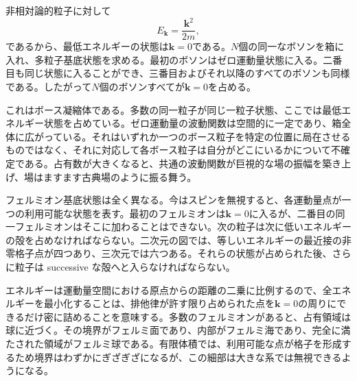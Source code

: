 非相対論的粒子に対して
\begin{equation}
E_{\mathbf{k}}=\frac{\mathbf{k}^2}{2m},
\end{equation}
であるから、最低エネルギーの状態は\(\mathbf{k}=0\)である。\(N\)個の同一なボソンを箱に入れ、多粒子基底状態を求める。最初のボソンはゼロ運動量状態に入る。二番目も同じ状態に入ることができ、三番目およびそれ以降のすべてのボソンも同様である。したがって\(N\)個のボソンすべてが\(\mathbf{k}=0\)を占める。

これはボース凝縮体である。多数の同一粒子が同じ一粒子状態、ここでは最低エネルギー状態を占めている。ゼロ運動量の波動関数は空間的に一定であり、箱全体に広がっている。それはいずれか一つのボース粒子を特定の位置に局在させるものではなく、それに対応して各ボース粒子は自分がどこにいるかについて不確定である。占有数が大きくなると、共通の波動関数が巨視的な場の振幅を築き上げ、場はますます古典場のように振る舞う。

フェルミオン基底状態は全く異なる。今はスピンを無視すると、各運動量点が一つの利用可能な状態を表す。最初のフェルミオンは\(\mathbf{k}=0\)に入るが、二番目の同一フェルミオンはそこに加わることはできない。次の粒子は次に低いエネルギーの殻を占めなければならない。二次元の図では、等しいエネルギーの最近接の非零格子点が四つあり、三次元では六つある。それらの状態が占められた後、さらに粒子は successive な殻へと入らなければならない。

エネルギーは運動量空間における原点からの距離の二乗に比例するので、全エネルギーを最小化することは、排他律が許す限り占められた点を\(\mathbf{k}=0\)の周りにできるだけ密に詰めることを意味する。多数のフェルミオンがあると、占有領域は球に近づく。その境界がフェルミ面であり、内部がフェルミ海であり、完全に満たされた領域がフェルミ球である。有限体積では、利用可能な点が格子を形成するため境界はわずかにぎざぎざになるが、この細部は大きな系では無視できるようになる。


